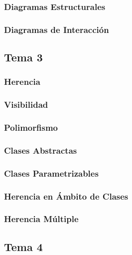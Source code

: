 \documentclass[a4paper,12pt]{article}
\begin{document}
\subsubsection{Diagramas Estructurales}

\subsubsection{Diagramas de Interacción}


\subsection{Tema 3}
\subsubsection{Herencia}

\subsubsection{Visibilidad}

\subsubsection{Polimorfismo}

\subsubsection{Clases Abstractas}

\subsubsection{Clases Parametrizables}

\subsubsection{Herencia en Ámbito de Clases}

\subsubsection{Herencia Múltiple}


\subsection{Tema 4}
\end{document}
